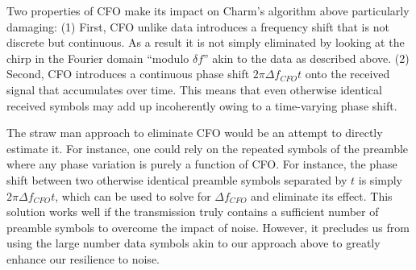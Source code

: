 Two properties of CFO make its impact on Charm's algorithm above particularly damaging: (1) First, CFO unlike data introduces a frequency shift that is not discrete but continuous. As a result it is not simply eliminated by looking at the chirp in the Fourier domain ``modulo $\delta f$''  akin to the data as described above. (2) Second, CFO introduces a continuous phase shift $2 \pi \Delta f_{CFO} t$ onto the received signal that accumulates over time. This means that even otherwise identical received symbols may add up incoherently owing to a time-varying phase shift. 

The straw man approach to eliminate CFO would be an attempt to directly estimate it. For instance, one could rely on the repeated symbols of the preamble where any phase variation is purely a function of CFO. For instance, the phase shift between two otherwise identical preamble symbols separated by $t$ is simply $2 \pi \Delta f_{CFO} t$, which can be used to solve for $\Delta f_{CFO}$ and eliminate its effect. This solution works well if the transmission truly contains a sufficient number of preamble symbols to overcome the impact of noise. However, it precludes us from using the large number data symbols akin to our approach above to greatly enhance our resilience to noise. 



